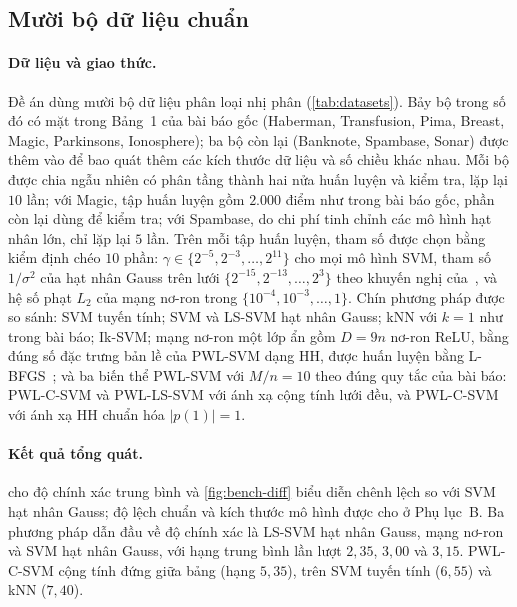 \subsection{Mười bộ dữ liệu chuẩn}\label{sec:bench10}

\paragraph{Dữ liệu và giao thức.} Đề án dùng mười bộ dữ liệu phân loại nhị phân (\cref{tab:datasets}). Bảy bộ trong số đó có mặt trong Bảng~1 của bài báo gốc (Haberman, Transfusion, Pima, Breast, Magic, Parkinsons, Ionosphere); ba bộ còn lại (Banknote, Spambase, Sonar) được thêm vào để bao quát thêm các kích thước dữ liệu và số chiều khác nhau. Mỗi bộ được chia ngẫu nhiên có phân tầng thành hai nửa huấn luyện và kiểm tra, lặp lại $10$ lần; với Magic, tập huấn luyện gồm $2.000$ điểm như trong bài báo gốc, phần còn lại dùng để kiểm tra; với Spambase, do chi phí tinh chỉnh các mô hình hạt nhân lớn, chỉ lặp lại $5$ lần. Trên mỗi tập huấn luyện, tham số được chọn bằng kiểm định chéo $10$ phần: $\gamma\in\{2^{-5},2^{-3},\dots,2^{11}\}$ cho mọi mô hình SVM, tham số $1/\sigma^2$ của hạt nhân Gauss trên lưới $\{2^{-15},2^{-13},\dots,2^{3}\}$ theo khuyến nghị của~\cite{hsu2003}, và hệ số phạt $L_2$ của mạng nơ-ron trong $\{10^{-4},10^{-3},\dots,1\}$. Chín phương pháp được so sánh: SVM tuyến tính; SVM và LS-SVM hạt nhân Gauss; kNN với $k=1$ như trong bài báo; Ik-SVM; mạng nơ-ron một lớp ẩn gồm $D=9n$ nơ-ron ReLU, bằng đúng số đặc trưng bản lề của PWL-SVM dạng HH, được huấn luyện bằng L-BFGS~\cite{liu1989}; và ba biến thể PWL-SVM với $M/n=10$ theo đúng quy tắc của bài báo: PWL-C-SVM và PWL-LS-SVM với ánh xạ cộng tính lưới đều, và PWL-C-SVM với ánh xạ HH chuẩn hóa $|p(1)|=1$.





\paragraph{Kết quả tổng quát.}  cho độ chính xác trung bình và \cref{fig:bench-diff} biểu diễn chênh lệch so với SVM hạt nhân Gauss; độ lệch chuẩn và kích thước mô hình được cho ở Phụ lục~B. Ba phương pháp dẫn đầu về độ chính xác là LS-SVM hạt nhân Gauss, mạng nơ-ron và SVM hạt nhân Gauss, với hạng trung bình lần lượt $2{,}35$, $3{,}00$ và $3{,}15$. PWL-C-SVM cộng tính đứng giữa bảng (hạng $5{,}35$), trên SVM tuyến tính ($6{,}55$) và kNN ($7{,}40$).

